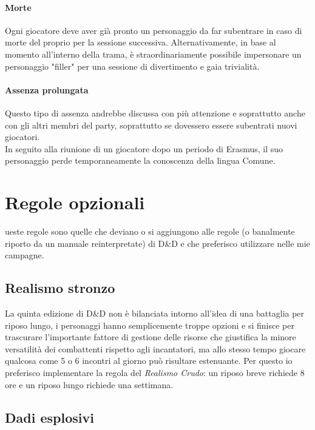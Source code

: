 \paragraph{Morte}

Ogni giocatore deve aver già pronto un personaggio da far subentrare in caso di morte del proprio per la sessione successiva. Alternativamente, in base al momento all'interno della trama, è straordinariamente possibile impersonare un personaggio "filler" per una sessione di divertimento e gaia trivialità.

\paragraph{Assenza prolungata}

Questo tipo di assenza andrebbe discussa con più attenzione e soprattutto anche con gli altri membri del party, soprattutto se dovessero essere subentrati nuovi giocatori. \\ In seguito alla riunione di un giocatore dopo un periodo di Erasmus, il suo personaggio perde temporaneamente la conoscenza della lingua Comune.

\section{Regole opzionali}

ueste regole sono quelle che deviano o si aggiungono alle regole (o banalmente riporto da un manuale reinterpretate) di D\&D e che preferisco utilizzare nelle mie campagne.

\subsection{Realismo stronzo}

La quinta edizione di D\&D non è bilanciata intorno all'idea di una battaglia per riposo lungo, i personaggi hanno semplicemente troppe opzioni e si finisce per trascurare l'importante fattore di gestione delle risorse che giustifica la minore versatilità dei combattenti rispetto agli incantatori, ma allo stesso tempo giocare qualcosa come 5 o 6 incontri al giorno può risultare estenuante. Per questo io preferisco implementare la regola del \textit{Realismo Crudo}: un riposo breve richiede 8 ore e un riposo lungo richiede una settimana.

\subsection{Dadi esplosivi}

